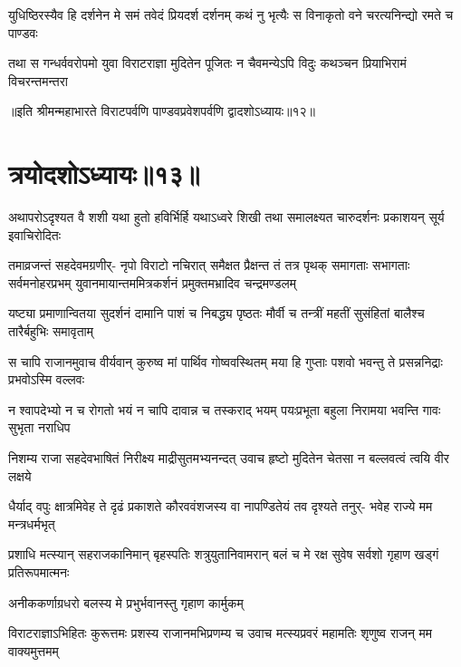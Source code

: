 \fourlineindentedshloka
{युधिष्ठिरस्यैव हि दर्शनेन मे}
{समं तवेदं प्रियदर्श दर्शनम्}
{कथं नु भृत्यैः स विनाकृतो वने}
{चरत्यनिन्द्यो रमते च पाण्डवः}



\fourlineindentedshloka
{तथा स गन्धर्ववरोपमो युवा}
{विराटराज्ञा मुदितेन पूजितः}
{न चैवमन्येऽपि विदुः कथञ्चन}
{प्रियाभिरामं विचरन्तमन्तरा}

॥इति श्रीमन्महाभारते विराटपर्वणि पाण्डवप्रवेशपर्वणि द्वादशोऽध्यायः॥१२॥

\chapter{त्रयोदशोऽध्यायः॥१३॥}

\fourlineindentedshloka
{अथापरोऽदृश्यत वै शशी यथा}
{हुतो हविर्भिर्हि यथाऽध्वरे शिखी}
{तथा समालक्ष्यत चारुदर्शनः}
{प्रकाशयन् सूर्य इवाचिरोदितः}


\sixlineindentedshloka
{तमाव्रजन्तं सहदेवमग्रणीर्-}
{नृपो विराटो नचिरात् समैक्षत}
{प्रैक्षन्त तं तत्र पृथक् समागताः}
{सभागताः सर्वमनोहरप्रभम्}
{युवानमायान्तममित्रकर्शनं}
{प्रमुक्तमभ्रादिव चन्द्रमण्डलम्}


\fourlineindentedshloka
{यष्ट्या प्रमाणान्वितया सुदर्शनं}
{दामानि पाशं च निबद्ध्य पृष्ठतः}
{मौर्वी च तन्त्रीं महतीं सुसंहितां}
{बालैश्च तारैर्बहुभिः समावृताम्}


\fourlineindentedshloka
{स चापि राजानमुवाच वीर्यवान्}
{कुरुष्व मां पार्थिव गोष्ववस्थितम्}
{मया हि गुप्ताः पशवो भवन्तु ते}
{प्रसन्ननिद्राः प्रभवोऽस्मि वल्लवः}


\fourlineindentedshloka
{न श्वापदेभ्यो न च रोगतो भयं}
{न चापि दावान्न च तस्कराद् भयम्}
{पयःप्रभूता बहुला निरामया}
{भवन्ति गावः सुभृता नराधिप}


\fourlineindentedshloka
{निशम्य राजा सहदेवभाषितं}
{निरीक्ष्य माद्रीसुतमभ्यनन्दत्}
{उवाच हृष्टो मुदितेन चेतसा}
{न बल्लवत्वं त्वयि वीर लक्षये}


\fourlineindentedshloka
{धैर्याद् वपुः क्षात्रमिवेह ते दृढं}
{प्रकाशते कौरववंशजस्य वा}
{नापण्डितेयं तव दृश्यते तनुर्-}
{भवेह राज्ये मम मन्त्रधर्मभृत्}


\fourlineindentedshloka
{प्रशाधि मत्स्यान् सहराजकानिमान्}
{बृहस्पतिः शत्रुयुतानिवामरान्}
{बलं च मे रक्ष सुवेष सर्वशो}
{गृहाण खड्गं प्रतिरूपमात्मनः}


\onelineindentedshloka
{अनीककर्णाग्रधरो बलस्य मे}
{प्रभुर्भवानस्तु गृहाण कार्मुकम्}



\fourlineindentedshloka
{विराटराज्ञाऽभिहितः कुरूत्तमः}
{प्रशस्य राजानमभिप्रणम्य च}
{उवाच मत्स्यप्रवरं महामतिः}
{शृणुष्व राजन् मम वाक्यमुत्तमम्}


